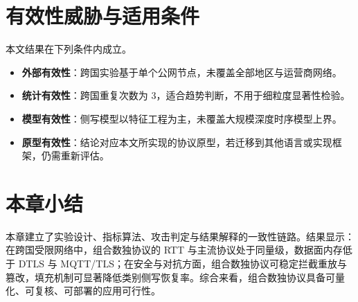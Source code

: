 \section{有效性威胁与适用条件}
本文结果在下列条件内成立。
\begin{itemize}
  \item \textbf{外部有效性}：跨国实验基于单个公网节点，未覆盖全部地区与运营商网络。
  \item \textbf{统计有效性}：跨国重复次数为 3，适合趋势判断，不用于细粒度显著性检验。
  \item \textbf{模型有效性}：侧写模型以特征工程为主，未覆盖大规模深度时序模型上界。
  \item \textbf{原型有效性}：结论对应本文所实现的协议原型，若迁移到其他语言或实现框架，仍需重新评估。
\end{itemize}

\section{本章小结}
本章建立了实验设计、指标算法、攻击判定与结果解释的一致性链路。结果显示：在跨国受限网络中，组合数独协议的 RTT 与主流协议处于同量级，数据面内存低于 DTLS 与 MQTT/TLS；在安全与对抗方面，组合数独协议可稳定拦截重放与篡改，填充机制可显著降低类别侧写恢复率。综合来看，组合数独协议具备可量化、可复核、可部署的应用可行性。
